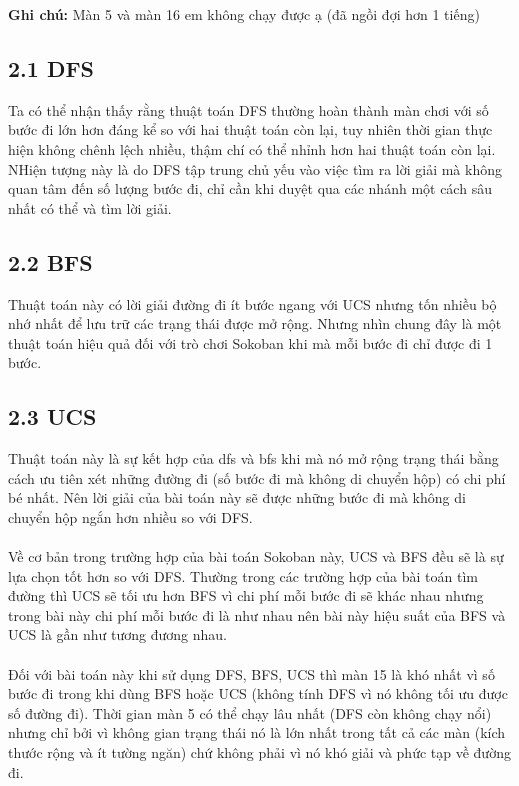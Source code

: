 \documentclass[a4paper,12pt]{article}
\begin{document}
\textbf{Ghi chú:} Màn 5 và màn 16 em không chạy được ạ (đã ngồi đợi hơn 1 tiếng) 

\subsection*{2.1 DFS}
 \hspace*{7mm}Ta có thể nhận thấy rằng thuật toán DFS thường hoàn thành màn chơi với số bước đi lớn hơn đáng kể so với hai thuật toán còn lại, tuy nhiên thời gian thực hiện không chênh lệch nhiều, thậm chí có thể nhỉnh hơn hai thuật toán còn lại. NHiện tượng này là do DFS tập trung chủ yếu vào việc tìm ra lời giải mà không quan tâm đến số lượng bước đi, chỉ cần khi duyệt qua các nhánh một cách sâu nhất có thể và tìm lời giải.
\subsection*{2.2 BFS}
\hspace*{7mm}Thuật toán này có lời giải đường đi ít bước ngang với UCS nhưng tốn nhiều bộ nhớ nhất để lưu trữ các trạng thái được mở rộng. Nhưng nhìn chung đây là một thuật toán hiệu quả đối với trò chơi Sokoban khi mà mỗi bước đi chỉ được đi 1 bước. 
\subsection*{2.3 UCS}
\hspace*{7mm}Thuật toán này là sự kết hợp của dfs và bfs khi mà nó mở rộng trạng thái bằng cách ưu tiên xét những đường đi (số bước đi mà không di chuyển hộp) có chi phí bé nhất. Nên lời giải của bài toán này sẽ được những bước đi mà không di chuyển hộp ngắn hơn nhiều so với DFS.\\
\\
\newpage
\hspace*{7mm} Về cơ bản trong trường hợp của bài toán Sokoban này, UCS và BFS đều sẽ là sự lựa chọn tốt hơn so với DFS. Thường trong các trường hợp của bài toán tìm đường thì UCS sẽ tối ưu hơn BFS vì chi phí mỗi bước đi sẽ khác nhau nhưng trong bài này chi phí mỗi bước đi là như nhau nên bài này hiệu suất của BFS và UCS là gần như tương đương nhau.\\
\\
\hspace*{7mm} Đối với bài toán này khi sử dụng DFS, BFS, UCS thì màn 15 là khó nhất vì số bước đi trong khi dùng BFS hoặc UCS (không tính DFS vì nó không tối ưu được số đường đi). Thời gian màn 5 có thể chạy lâu nhất (DFS còn không chạy nổi) nhưng chỉ bởi vì không gian trạng thái nó là lớn nhất trong tất cả các màn (kích thước rộng và ít tường ngăn) chứ không phải vì nó khó giải và phức tạp về đường đi.
\end{document}
